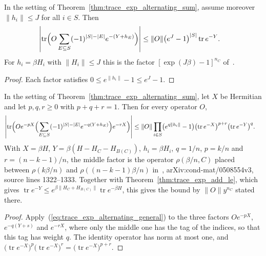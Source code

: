 \begin{theorem}
    \label{thm:trace_exp_alternating_sum_pow}
    \leanok
    In the setting of Theorem~\ref{thm:trace_exp_alternating_sum}, assume
    moreover $\|h_i\|\le J$ for all $i\in S$. Then
    \begin{align}
        \left|\operatorname{tr}\Bigl(O\sum_{E\subseteq S}(-1)^{|S|-|E|}
        e^{-(Y+h_E)}\Bigr)\right|
         & \le \|O\|\bigl(e^{J}-1\bigr)^{|S|}\operatorname{tr}e^{-Y}.
    \end{align}
    For $h_i=\beta H_i$ with $\|H_i\|\le J$ this is the factor
    $[\exp(J\beta)-1]^{n_C}$ of~\cite{Hastings2006Solving}.
\end{theorem}
\begin{proof}\leanok
    Each factor satisfies $0\le e^{\|h_i\|}-1\le e^{J}-1$.
\end{proof}

\begin{theorem}
    \label{thm:trace_exp_alternating_sum_between}
    \leanok
    In the setting of Theorem~\ref{thm:trace_exp_alternating_sum}, let $X$ be
    Hermitian and let $p,q,r\ge0$ with $p+q+r=1$. Then for every operator $O$,
    \begin{align}
        \left|\operatorname{tr}\Bigl(Oe^{-pX}\Bigl(\sum_{E\subseteq S}(-1)^{|S|-|E|}
        e^{-q(Y+h_E)}\Bigr)e^{-rX}\Bigr)\right|
         & \le \|O\|\prod_{i\in S}\bigl(e^{q\|h_i\|}-1\bigr)
        \bigl(\operatorname{tr}e^{-X}\bigr)^{p+r}
        \bigl(\operatorname{tr}e^{-Y}\bigr)^{q}.
        \label{eq:trace_exp_alternating_sum_between}
    \end{align}
    With $X=\beta H$, $Y=\beta(H-H_C-H_{B(C)})$, $h_i=\beta H_i$, $q=1/n$,
    $p=k/n$ and $r=(n-k-1)/n$, the middle factor is the operator
    $\rho(\beta/n,C)$ placed between $\rho(k\beta/n)$ and
    $\rho((n-k-1)\beta/n)$ in~\cite{Hastings2006Solving},
    arXiv:cond-mat/0508554v3, source lines 1322--1333. Together with
    Theorem~\ref{thm:trace_exp_add_le}, which gives
    $\operatorname{tr}e^{-Y}\le e^{\beta\|H_C+H_{B(C)}\|}\operatorname{tr}e^{-\beta H}$,
    this gives the bound by $\|O\|y^{n_C}$ stated there.
\end{theorem}
\begin{proof}\leanok
    Apply~(\ref{eq:trace_exp_alternating_general}) to the three factors
    $Oe^{-pX}$, $e^{-q(Y+s)}$ and $e^{-rX}$, where only the middle one
    has the tag of the indices, so that this tag has weight $q$. The identity operator has norm at most
    one, and
    $\bigl(\operatorname{tr}e^{-X}\bigr)^{p}\bigl(\operatorname{tr}e^{-X}\bigr)^{r}
        =\bigl(\operatorname{tr}e^{-X}\bigr)^{p+r}$.
\end{proof}

